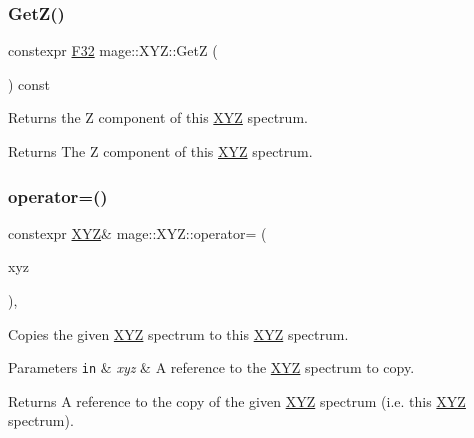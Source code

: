 \subsubsection{\texorpdfstring{Get\+Z()}{GetZ()}}
{\footnotesize\ttfamily constexpr \mbox{\hyperlink{namespacemage_aa97e833b45f06d60a0a9c4fc22ae02c0}{F32}} mage\+::\+X\+Y\+Z\+::\+GetZ (\begin{DoxyParamCaption}{ }\end{DoxyParamCaption}) const\hspace{0.3cm}{\ttfamily [noexcept]}}

Returns the Z component of this \mbox{\hyperlink{structmage_1_1_x_y_z}{X\+YZ}} spectrum.

\begin{DoxyReturn}{Returns}
The Z component of this \mbox{\hyperlink{structmage_1_1_x_y_z}{X\+YZ}} spectrum. 
\end{DoxyReturn}
\mbox{\label{structmage_1_1_x_y_z_acf2ea9538d1f6a496557d3d0f2538a0c}} 
\subsubsection{\texorpdfstring{operator=()}{operator=()}\hspace{0.1cm}{\footnotesize\ttfamily [1/2]}}
{\footnotesize\ttfamily constexpr \mbox{\hyperlink{structmage_1_1_x_y_z}{X\+YZ}}\& mage\+::\+X\+Y\+Z\+::operator= (\begin{DoxyParamCaption}\item[{const \mbox{\hyperlink{structmage_1_1_x_y_z}{X\+YZ}} \&}]{xyz }\end{DoxyParamCaption})\hspace{0.3cm}{\ttfamily [default]}, {\ttfamily [noexcept]}}

Copies the given \mbox{\hyperlink{structmage_1_1_x_y_z}{X\+YZ}} spectrum to this \mbox{\hyperlink{structmage_1_1_x_y_z}{X\+YZ}} spectrum.


\begin{DoxyParams}[1]{Parameters}
\mbox{\tt in}  & {\em xyz} & A reference to the \mbox{\hyperlink{structmage_1_1_x_y_z}{X\+YZ}} spectrum to copy. \\
\hline
\end{DoxyParams}
\begin{DoxyReturn}{Returns}
A reference to the copy of the given \mbox{\hyperlink{structmage_1_1_x_y_z}{X\+YZ}} spectrum (i.\+e. this \mbox{\hyperlink{structmage_1_1_x_y_z}{X\+YZ}} spectrum). 
\end{DoxyReturn}
\mbox{\label{structmage_1_1_x_y_z_ab162a3b19bdbb5abd84ad77052ac6030}} 
